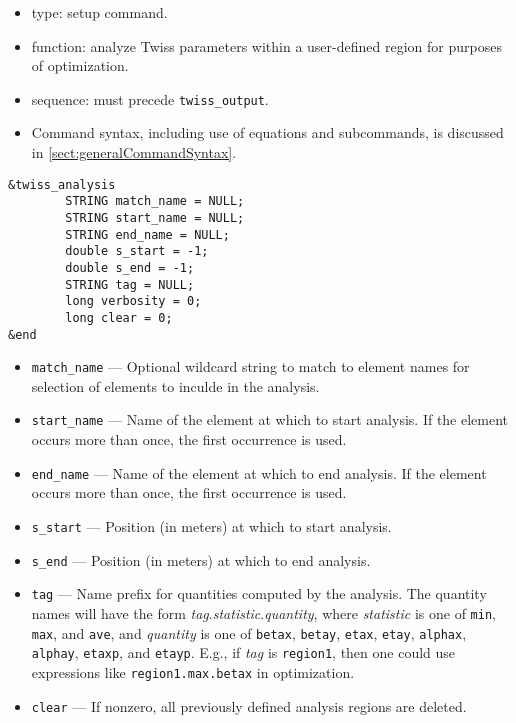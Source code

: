 \documentclass[11pt]{article}
\begin{document}
\begin{itemize}
\item type: setup command.
\item function: analyze Twiss parameters within a user-defined region for purposes of
        optimization.
\item sequence: must precede \verb|twiss_output|.
\item Command syntax, including use of equations and subcommands, is discussed in \ref{sect:generalCommandSyntax}.
\end{itemize}

\begin{verbatim}
&twiss_analysis
        STRING match_name = NULL;
        STRING start_name = NULL;
        STRING end_name = NULL;
        double s_start = -1;
        double s_end = -1;
        STRING tag = NULL;
        long verbosity = 0;
        long clear = 0;
&end
\end{verbatim}

\begin{itemize}
\item \verb|match_name| --- Optional wildcard string to match to element names for selection
  of elements to inculde in the analysis.
\item \verb|start_name| --- Name of the element at which to start analysis.  If the
        element occurs more than once, the first occurrence is used.
\item \verb|end_name| --- Name of the element at which to end analysis.  If the
        element occurs more than once, the first occurrence is used.
\item \verb|s_start| --- Position (in meters) at which to start analysis.
\item \verb|s_end| --- Position (in meters) at which to end analysis.
\item \verb|tag| --- Name prefix for quantities computed by the analysis.  The quantity
        names will have the form {\em tag}.{\em statistic}.{\em quantity}, where {\em statistic}
        is one of \verb|min|, \verb|max|, and \verb|ave|, and {\em quantity} is one of
        \verb|betax|, \verb|betay|, \verb|etax|, \verb|etay|, \verb|alphax|, \verb|alphay|, 
        \verb|etaxp|, and \verb|etayp|. E.g., if {\em tag} is \verb|region1|,
        then one could use expressions like \verb|region1.max.betax| in optimization.
\item \verb|clear| --- If nonzero, all previously defined analysis regions are deleted.
\end{itemize}
\end{document}
